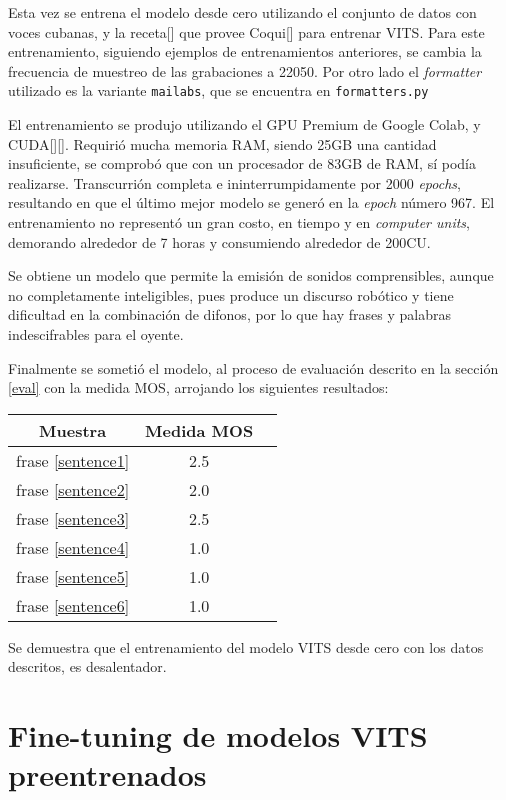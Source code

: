 Esta vez se entrena el modelo desde cero utilizando el conjunto de datos con voces cubanas, y la receta[\cite{train-vits}] que provee Coqui[\cite{coqui-doc}] para entrenar VITS. Para este entrenamiento, siguiendo ejemplos de entrenamientos anteriores, se cambia la frecuencia de muestreo de las grabaciones a 22050. Por otro lado el \textit{formatter} utilizado es la variante \texttt{mailabs}, que se encuentra en \texttt{formatters.py}

El entrenamiento se produjo utilizando el GPU Premium de Google Colab, y CUDA[\cite{cuda}][\cite{cuda1}]. Requirió mucha memoria RAM, siendo 25GB una cantidad insuficiente, se comprobó que con un procesador de 83GB de RAM, sí podía realizarse. Transcurrión completa e ininterrumpidamente por 2000 \textit{epochs}, resultando en que el último mejor modelo se generó en la \textit{epoch} número 967. El entrenamiento no representó un gran costo, en tiempo y en \textit{computer units}, demorando alrededor de 7 horas y consumiendo alrededor de 200CU.

Se obtiene un modelo que permite la emisión de sonidos comprensibles, aunque no completamente inteligibles, pues produce un discurso robótico y tiene dificultad en la combinación de difonos, por lo que hay frases y palabras indescifrables para el oyente.

Finalmente se sometió el modelo, al proceso de evaluación descrito en la sección \ref{eval} con la medida MOS, arrojando los siguientes resultados:

\begin{center} \begin{tabular}{ |c|c|c| } 
\hline 
Muestra & Medida MOS \\
\hline
frase \ref{sentence1} & 2.5 \\
frase \ref{sentence2} & 2.0 \\
frase \ref{sentence3} & 2.5 \\
frase \ref{sentence4} & 1.0 \\
frase \ref{sentence5} & 1.0 \\
frase \ref{sentence6} & 1.0 \\
 \hline 
\end{tabular} 
\end{center}

Se demuestra que el entrenamiento del modelo VITS desde cero con los datos descritos, es desalentador.


\section{Fine-tuning de modelos VITS preentrenados} \label{vits_it_en}

